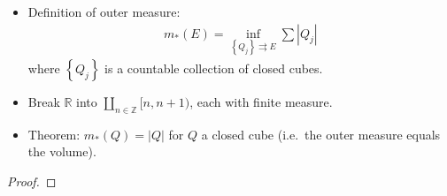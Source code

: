 \begin{solution}

\hfill

\begin{concept}

\hfill

\begin{itemize}
\tightlist
\item
  Definition of outer measure:
  \begin{align*} 
  m_*(E) = \inf_{\left\{{Q_j}\right\} \rightrightarrows E} \sum {\left\lvert {Q_j} \right\rvert}
  \end{align*}
  where \(\left\{{Q_j}\right\}\) is a countable collection of closed
  cubes.
\item
  Break \({\mathbb{R}}\) into
  \({\coprod}_{n\in {\mathbb{Z}}} [n, n+1)\), each with finite measure.
\item
  Theorem: \(m_*(Q) = {\left\lvert {Q} \right\rvert}\) for \(Q\) a
  closed cube (i.e.~the outer measure equals the volume).
\end{itemize}

\end{concept}

\begin{proof}

\hfill


\end{proof}
\end{solution}
